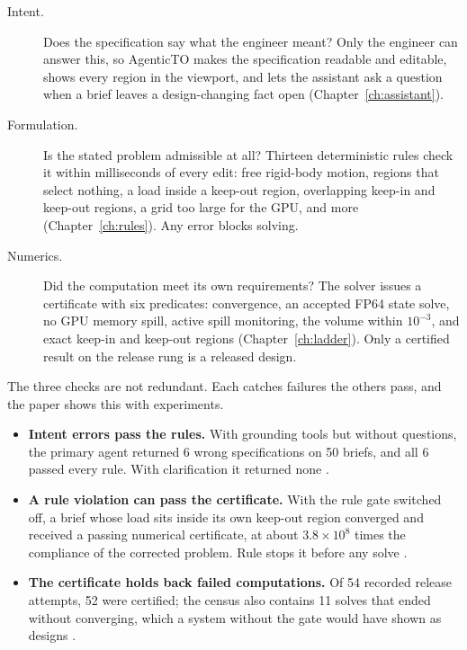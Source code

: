 \begin{description}
  \item[Intent.] Does the specification say what the engineer meant? Only the engineer can answer this, so AgenticTO
  makes the specification readable and editable, shows every region in the viewport, and lets the assistant ask a
  question when a brief leaves a design-changing fact open (Chapter~\ref{ch:assistant}).
  \item[Formulation.] Is the stated problem admissible at all? Thirteen deterministic rules check it within
  milliseconds of every edit: free rigid-body motion, regions that select nothing, a load inside a keep-out region,
  overlapping keep-in and keep-out regions, a grid too large for the GPU, and more (Chapter~\ref{ch:rules}). Any error
  blocks solving.
  \item[Numerics.] Did the computation meet its own requirements? The solver issues a certificate with six predicates:
  convergence, an accepted FP64 state solve, no GPU memory spill, active spill monitoring, the volume within
  $10^{-3}$, and exact keep-in and keep-out regions (Chapter~\ref{ch:ladder}). Only a certified result on the release
  rung is a released design.
\end{description}

The three checks are not redundant. Each catches failures the others pass, and the paper shows this with
experiments.

\begin{evidencebox}
\begin{itemize}[leftmargin=1.1em]
  \item \textbf{Intent errors pass the rules.} With grounding tools but without questions, the primary agent returned
  6 wrong specifications on 50 briefs, and all 6 passed every rule. With clarification it returned none
  .
  \item \textbf{A rule violation can pass the certificate.} With the rule gate switched off, a brief whose load sits
  inside its own keep-out region converged and received a passing numerical certificate, at about $3.8\times10^{8}$
  times the compliance of the corrected problem. Rule  stops it before any solve .
  \item \textbf{The certificate holds back failed computations.} Of 54 recorded release attempts, 52 were certified;
  the census also contains 11 solves that ended without converging, which a system without the gate would have shown as
  designs .
\end{itemize}
\end{evidencebox}

